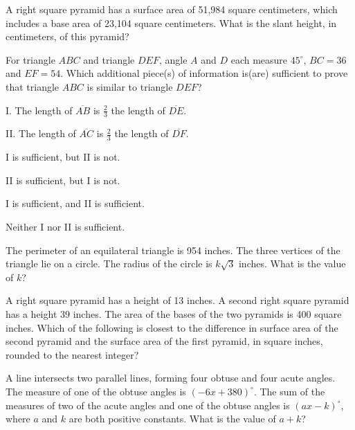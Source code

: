 \vfill
\clearpage
\noindent\begin{minipage}{\linewidth}
\par\smallskip
A right square pyramid has a surface area of 51,984 square centimeters, which includes a base area of 23,104 square centimeters. What is the slant height, in centimeters, of this pyramid?
\end{minipage}
\vfill
\noindent\begin{minipage}{\linewidth}
\par\smallskip
For triangle $ABC$ and triangle $DEF$, angle $A$ and $D$ each measure $45^\circ$, $BC=36$ and $EF=54$. Which additional piece(s) of information is(are) sufficient to prove that triangle $ABC$ is similar to triangle $DEF$?\par\smallskip I. The length of $\overline{AB}$ is $\frac{2}{3}$ the length of $\overline{DE}$.\par II. The length of $\overline{AC}$ is $\frac{2}{3}$ the length of $\overline{DF}$.
\begin{satchoices}
  \item[A)] I is sufficient, but II is not.
  \item[B)] II is sufficient, but I is not.
  \item[C)] I is sufficient, and II is sufficient.
  \item[D)] Neither I nor II is sufficient.
\end{satchoices}
\end{minipage}
\vfill
\noindent\begin{minipage}{\linewidth}
\par\smallskip
The perimeter of an equilateral triangle is 954 inches. The three vertices of the triangle lie on a circle. The radius of the circle is $k\sqrt{3}$ inches. What is the value of $k$?
\end{minipage}
\vfill
\clearpage
\noindent\begin{minipage}{\linewidth}
\par\smallskip
A right square pyramid has a height of 13 inches. A second right square pyramid has a height 39 inches. The area of the bases of the two pyramids is 400 square inches. Which of the following is closest to the difference in surface area of the second pyramid and the surface area of the first pyramid, in square inches, rounded to the nearest integer?
\end{minipage}
\vfill
\noindent\begin{minipage}{\linewidth}
\par\smallskip
A line intersects two parallel lines, forming four obtuse and four acute angles. The measure of one of the obtuse angles is $(-6x+380)^\circ$. The sum of the measures of two of the acute angles and one of the obtuse angles is $(ax-k)^\circ$, where $a$ and $k$ are both positive constants. What is the value of $a+k$?
\end{minipage}
